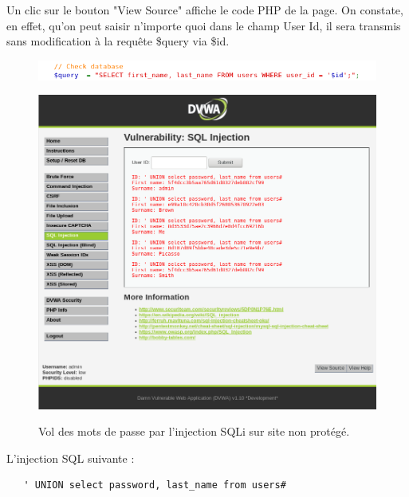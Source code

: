 Un clic sur le bouton "View Source" affiche le code PHP de la page. On constate, en effet, qu'on peut saisir n'importe quoi dans le champ User Id, il sera transmis sans modification à la requête \$query via \$id.   

\begin{figure}[!h]
	\begin{center}
		\label{}
		\includegraphics[scale=0.8]{images/sql/code_low.png}
	\end{center}
\end{figure}



\begin{figure}[!h]
	\begin{center}
		\label{}
		\includegraphics[scale=\scaledvwa]{images/sql/sqli_low.png}
		\caption{Vol des mots de passe par l'injection SQLi sur site non protégé.}
	\end{center}
\end{figure}

L'injection SQL suivante :
{\color{red}

\begin{verbatim}
   ' UNION select password, last_name from users#
\end{verbatim}
}

